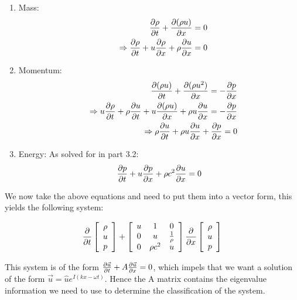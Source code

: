 \documentclass{article}
\begin{document}
\begin{enumerate}
\begin{enumerate}
\begin{enumerate}
\item Mass:
\begin{eqnarray}
&& \frac{\partial \rho}{\partial t} + \frac{\partial (\rho u)}{\partial x} = 0 \nonumber \\
&& \Rightarrow \frac{\partial \rho}{\partial t} + u \frac{\partial \rho}{\partial x} + \rho \frac{\partial u}{\partial x}= 0
\end{eqnarray}

\item Momentum:
\begin{eqnarray}
&& \frac{\partial (\rho u)}{\partial t} + \frac{\partial (\rho u^2)}{\partial x} = -\frac{\partial p}{\partial x} \nonumber \\
&& \Rightarrow u \frac{\partial \rho }{\partial t} + \rho \frac{\partial u }{\partial t} + u \frac{\partial (\rho u) }{\partial x} + \rho u \frac{\partial u }{\partial x} = -\frac{\partial p }{\partial x}\nonumber \\
&& \Rightarrow \rho \frac{\partial u }{\partial t} + \rho u \frac{\partial u }{\partial x} + \frac{\partial p }{\partial x} = 0
\end{eqnarray}

\item Energy:
As solved for in part 3.2:
\begin{equation}
\frac{\partial p}{\partial t} + u \frac{\partial p}{\partial x} + \rho c^2 \frac{\partial u}{\partial x} = 0
\end{equation}
\end{enumerate}


We now take the above equations and need to put them into a vector form, this yields the following system:

\begin{equation}
\frac{\partial}{\partial t} \left[\begin{array}{c} \rho \\ u \\ p \end{array}\right]+\left[\begin{array}{ccc} u & 1 & 0 \\ 0 & u & \frac{1}{\rho}\\0 & \rho c^2 & u \end{array} \right]\frac{\partial}{\partial x} \left[\begin{array}{c} \rho \\ u \\ p \end{array}\right]
\end{equation}

This system is of the form $\frac{\partial \vec{u}}{\partial t} + A \frac{\partial \vec{u}}{\partial x} = 0$, which impels that we want a solution of the form $\vec{u} = \hat{u} e^{I(kx-\omega t)}$. Hence the A matrix contains the eigenvalue information we need to use to determine the classification of the system.


\end{enumerate}
\end{enumerate}
\end{document}
